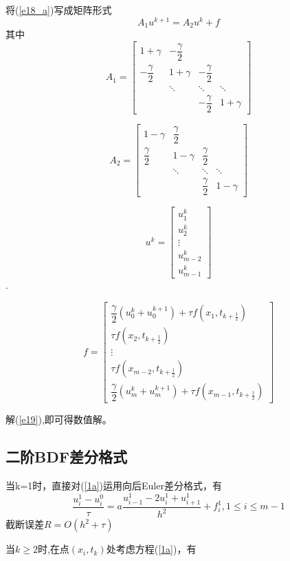 \documentclass[withoutpreface,bwprint]{cumcmthesis} %
\begin{document}
将(\ref{e18_a})写成矩阵形式
\begin{equation}
\label{e19}
A_1u^{k+1}=A_2u^k+f
\end{equation}
其中
$$
A_1=
\begin{bmatrix}
1+\gamma & -\dfrac{\gamma}{2} \\
-\dfrac{\gamma}{2} & 1+\gamma & -\dfrac{\gamma}{2} \\
& \ddots & \ddots & \ddots \\
& & 	-\dfrac{\gamma}{2} & 1+\gamma
\end{bmatrix}
$$

$$
A_2=
\begin{bmatrix}
1-\gamma & \dfrac{\gamma}{2} \\
\dfrac{\gamma}{2} & 1-\gamma & \dfrac{\gamma}{2} \\
& \ddots & \ddots & \ddots \\
& & 	\dfrac{\gamma}{2} & 1-\gamma
\end{bmatrix}
$$

$$
u^k=
\begin{bmatrix}
u_1^k\\
u_2^k\\
\vdots\\
u_{m-2}^k \\
u_{m-1}^k
\end{bmatrix}
$$.

$$
f=
\begin{bmatrix}
\dfrac{\gamma}{2}(u_0^k+u_0^{k+1})+\tau f(x_1,t_{k+\frac{1}{2}}) \\
\tau f(x_2,t_{k+\frac{1}{2}})\\
\vdots \\
\tau f(x_{m-2},t_{k+\frac{1}{2}}) \\
\dfrac{\gamma}{2}(u_m^k+u_m^{k+1})+\tau f(x_{m-1},t_{k+\frac{1}{2}})
\end{bmatrix}
$$

解(\ref{e19}),即可得数值解。


\subsection{二阶BDF差分格式}
当k=1时，直接对(\ref{1a})运用向后Euler差分格式，有
\begin{equation}
\label{e20}
\dfrac{u_i^1-u_i^0}{\tau}=a\dfrac{u_{i-1}^1-2u_i^1+u_{i+1}^1}{h^2}+f_i^1 ,1 \leq i \leq m-1
\end{equation}
截断误差$ R=O(h^2+\tau) $


当$ k \geq 2 $时,在点$(x_i,t_k)$处考虑方程(\ref{1a})，有
\end{document}
